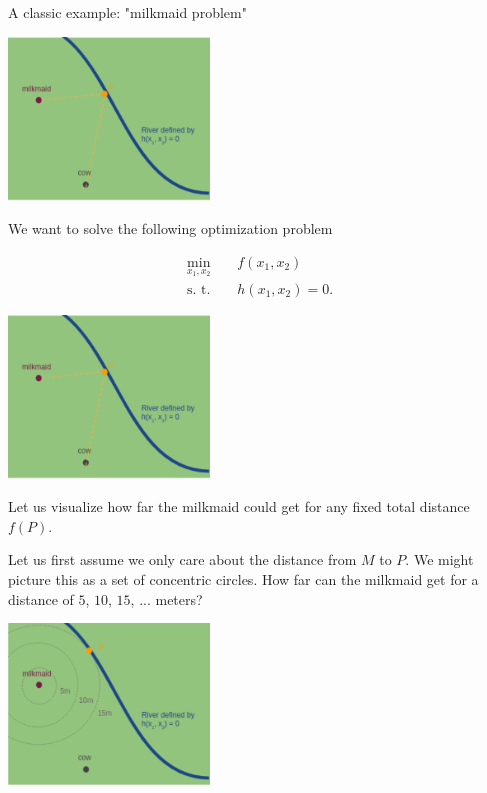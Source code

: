 \documentclass[11pt,compress,t,notes=noshow, xcolor=table]{beamer}
\begin{document}
\begin{vbframe}{A classic example: "milkmaid problem"}
\begin{center}
	\includegraphics[width = 0.4\textwidth]{figure_man/milkmaid2.png}
\end{center}


\framebreak 

We want to solve the following optimization problem 

\begin{eqnarray*}
	\min_{x_1, x_2} && f(x_1, x_2) \\
	\text{s. t. } && h(x_1, x_2) = 0.
\end{eqnarray*}


\begin{center}
	\includegraphics[width = 0.4\textwidth]{figure_man/milkmaid2.png}
\end{center}


\framebreak 

Let us visualize how far the milkmaid could get for any fixed total distance $f(P)$. 

\vspace*{0.2cm}

Let us first assume we only care about the distance from $M$ to $P$. We might picture this as a set of concentric circles. How far can the milkmaid get for a distance of $5$, $10$, $15$, ... meters?

\begin{center}
	\includegraphics[width = 0.4\textwidth]{figure_man/milkmaid3.png}
\end{center}


\end{vbframe}
\end{document}
